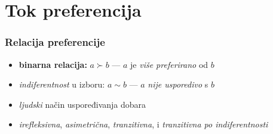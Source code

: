 \documentclass[11pt, notheorems]{beamer}
\begin{document}
  \section{Tok preferencija}
  \begin{frame}
    \frametitle{Relacija preferencije}
    \begin{itemize}
      \item \textbf{binarna relacija:} $a \succ b$ --- $a$ je \emph{više preferirano} od $b$
      \item \emph{indiferentnost} u izboru: $a \sim b$ --- $a$ \emph{nije usporedivo} s $b$
      \item \emph{ljudski} način uspoređivanja dobara
      \item \emph{irefleksivna}, \emph{asimetrična}, \emph{tranzitivna}, i \emph{tranzitivna po indiferentnosti} 
    \end{itemize}
  \end{frame}
\end{document}
